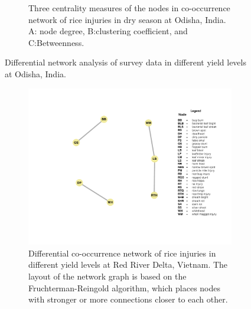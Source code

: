 \begin{figure}
\begin{subfigure}[b]{1\textwidth}
        \caption[Three centrality measures of the nodes in co-occurrence network of rice injuries in dry season at Odisha, India.]{Three centrality measures of the nodes in co-occurrence network of rice injuries in dry season at Odisha, India. A: node degree, B:clustering coefficient, and C:Betweenness.}
        \label{fig:nodepropdifyield_OD}
    \end{subfigure}
    \caption{Differential network analysis of survey data in different yield levels at Odisha, India.}
    \label{fig:difyield_OD}
\end{figure}
 
 \begin{figure}
    \centering
    \begin{subfigure}[b]{1\textwidth}
        \includegraphics[width = 1\textwidth]{figures/difyieldRR/difyieldRR.pdf}
        \caption[Differential co-occurrence network of rice injuries in different yield levels at Red River Delta, Vietnam. ]{Differential co-occurrence network of rice injuries in different yield levels at Red River Delta, Vietnam. The layout of the network graph is based on the Fruchterman-Reingold algorithm, which places nodes with stronger or more connections closer to each other.}
        \label{fig:difyieldnetwork_RR}
    \end{subfigure}
    \begin{subfigure}[b]{1\textwidth}

\end{subfigure}
\end{figure}
